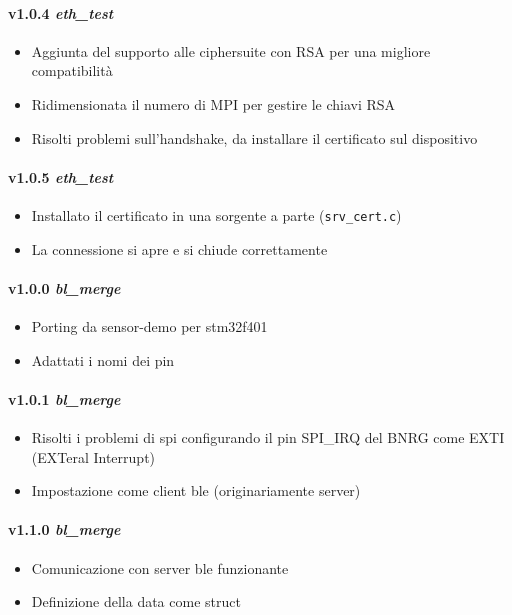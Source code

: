 \paragraph{v1.0.4 \textit{eth\_test}}
	\begin{itemize}
		\item Aggiunta del supporto alle ciphersuite con RSA per una migliore compatibilit\`{a}
		\item Ridimensionata il numero di MPI per gestire le chiavi RSA
		\item Risolti problemi sull'handshake, da installare il certificato sul dispositivo
	\end{itemize}
\paragraph{v1.0.5 \textit{eth\_test}}
	\begin{itemize}
		\item Installato il certificato in una sorgente a parte (\texttt{srv\_cert.c})
		\item La connessione si apre e si chiude correttamente
	\end{itemize}
\paragraph{v1.0.0 \textit{bl\_merge}}
	\begin{itemize}
		\item Porting da sensor-demo per stm32f401
		\item Adattati i nomi dei pin
	\end{itemize}
\paragraph{v1.0.1 \textit{bl\_merge}}
	\begin{itemize}
		\item Risolti i problemi di spi configurando il pin SPI\_IRQ del BNRG come EXTI (EXTeral Interrupt)
		\item Impostazione come client ble (originariamente server)
	\end{itemize}
\paragraph{v1.1.0 \textit{bl\_merge}}
	\begin{itemize}
		\item Comunicazione con server ble funzionante
		\item Definizione della data come struct
	\end{itemize}
